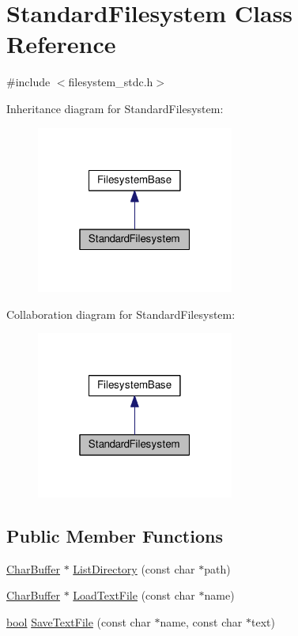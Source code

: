 \hypertarget{classStandardFilesystem}{}\section{Standard\+Filesystem Class Reference}
\label{classStandardFilesystem}


{\ttfamily \#include $<$filesystem\+\_\+stdc.\+h$>$}



Inheritance diagram for Standard\+Filesystem\+:
\nopagebreak
\begin{figure}[H]
\begin{center}
\leavevmode
\includegraphics[width=184pt]{d1/dfc/classStandardFilesystem__inherit__graph}
\end{center}
\end{figure}


Collaboration diagram for Standard\+Filesystem\+:
\nopagebreak
\begin{figure}[H]
\begin{center}
\leavevmode
\includegraphics[width=184pt]{d6/d11/classStandardFilesystem__coll__graph}
\end{center}
\end{figure}
\subsection*{Public Member Functions}
\begin{DoxyCompactItemize}
\item 
\hyperlink{classCharBuffer}{Char\+Buffer} $\ast$ \hyperlink{classStandardFilesystem_a535ef937063f59dcb61560d44ed18e81}{List\+Directory} (const char $\ast$path)
\item 
\hyperlink{classCharBuffer}{Char\+Buffer} $\ast$ \hyperlink{classStandardFilesystem_aa01514561ced127f2453b3a913e077ef}{Load\+Text\+File} (const char $\ast$name)
\item 
\hyperlink{platform_8h_a1062901a7428fdd9c7f180f5e01ea056}{bool} \hyperlink{classStandardFilesystem_ad2e93d1364a5b9491e14b54cb7fe924f}{Save\+Text\+File} (const char $\ast$name, const char $\ast$text)
\end{DoxyCompactItemize}
